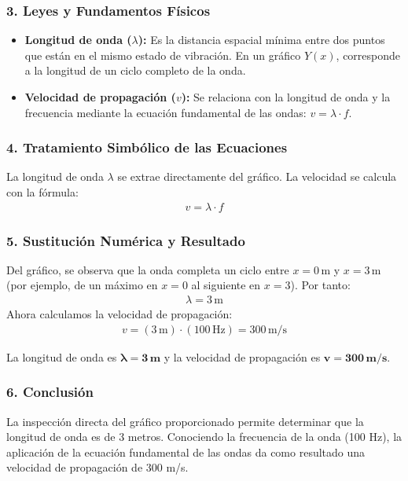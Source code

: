 \subsubsection*{3. Leyes y Fundamentos Físicos}
\begin{itemize}
    \item \textbf{Longitud de onda ($\lambda$):} Es la distancia espacial mínima entre dos puntos que están en el mismo estado de vibración. En un gráfico $Y(x)$, corresponde a la longitud de un ciclo completo de la onda.
    \item \textbf{Velocidad de propagación ($v$):} Se relaciona con la longitud de onda y la frecuencia mediante la ecuación fundamental de las ondas: $v = \lambda \cdot f$.
\end{itemize}
\subsubsection*{4. Tratamiento Simbólico de las Ecuaciones}
La longitud de onda $\lambda$ se extrae directamente del gráfico. La velocidad se calcula con la fórmula:
\begin{gather}
    v = \lambda \cdot f
\end{gather}
\subsubsection*{5. Sustitución Numérica y Resultado}
Del gráfico, se observa que la onda completa un ciclo entre $x=0\,\text{m}$ y $x=3\,\text{m}$ (por ejemplo, de un máximo en $x=0$ al siguiente en $x=3$). Por tanto:
\begin{gather}
    \lambda = 3\,\text{m}
\end{gather}
Ahora calculamos la velocidad de propagación:
\begin{gather}
    v = (3\,\text{m}) \cdot (100\,\text{Hz}) = 300\,\text{m/s}
\end{gather}
\begin{cajaresultado}
    La longitud de onda es $\boldsymbol{\lambda = 3\,\textbf{m}}$ y la velocidad de propagación es $\boldsymbol{v = 300\,\textbf{m/s}}$.
\end{cajaresultado}
\subsubsection*{6. Conclusión}
\begin{cajaconclusion}
La inspección directa del gráfico proporcionado permite determinar que la longitud de onda es de 3 metros. Conociendo la frecuencia de la onda (100 Hz), la aplicación de la ecuación fundamental de las ondas da como resultado una velocidad de propagación de 300 m/s.
\end{cajaconclusion}
\newpage

